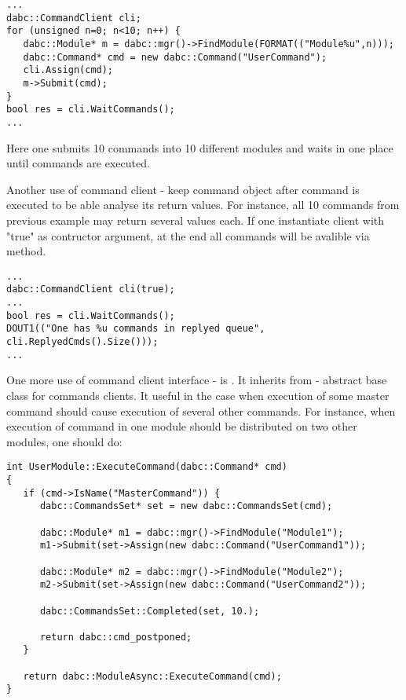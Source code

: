 \begin{small}
\begin{verbatim}
...
dabc::CommandClient cli;
for (unsigned n=0; n<10; n++) {
   dabc::Module* m = dabc::mgr()->FindModule(FORMAT(("Module%u",n)));
   dabc::Command* cmd = new dabc::Command("UserCommand");
   cli.Assign(cmd);
   m->Submit(cmd);
}
bool res = cli.WaitCommands();
...
\end{verbatim}     
\end{small}
  
Here one submits 10 commands into 10 different modules and waits in one place until commands are executed.

Another use of command client - keep command object after command is executed to be able
analyse its return values. For instance, all 10 commands from previous example may 
return several values each. If one instantiate client with "true" as contructor argument,
at the end all commands will be avalible via  method. 


\begin{small}
\begin{verbatim}
...
dabc::CommandClient cli(true);
...
bool res = cli.WaitCommands();
DOUT1(("One has %u commands in replyed queue", cli.ReplyedCmds().Size()));
...
\end{verbatim}     
\end{small}


One more use of command client interface - is . 
It inherits from  - abstract base class for commands clients. 
It useful in the case when execution of some master command should cause execution of several
other commands. For instance, when execution of command 
in one module should be distributed on two other modules, one should do:

   
\begin{small}
\begin{verbatim}
int UserModule::ExecuteCommand(dabc::Command* cmd)
{
   if (cmd->IsName("MasterCommand")) {
      dabc::CommandsSet* set = new dabc::CommandsSet(cmd);
      
      dabc::Module* m1 = dabc::mgr()->FindModule("Module1");
      m1->Submit(set->Assign(new dabc::Command("UserCommand1")); 

      dabc::Module* m2 = dabc::mgr()->FindModule("Module2");
      m2->Submit(set->Assign(new dabc::Command("UserCommand2")); 

      dabc::CommandsSet::Completed(set, 10.);
      
      return dabc::cmd_postponed;
   } 
      
   return dabc::ModuleAsync::ExecuteCommand(cmd);
}
\end{verbatim}     
\end{small}

